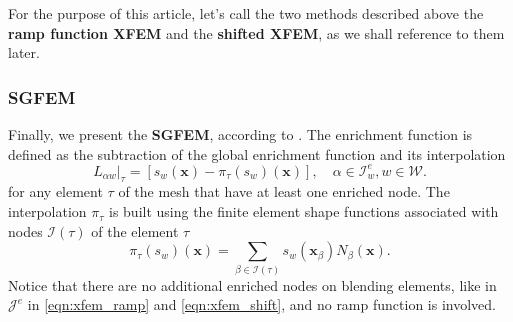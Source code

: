\documentclass{elsarticle}
\def\vc#1{\mathbf{\boldsymbol{#1}}}     %
\newcommand{\bx}{\vc{x}}
\begin{document}
For the purpose of this article, let's call the two methods described above the \textbf{ramp function XFEM}  
and the \textbf{shifted XFEM}, as we shall reference to them later.

\subsubsection{SGFEM}
Finally, we present the \textbf{SGFEM}, according to \cite{babuska_stable_2012,gupta_stable_2013}. 
The enrichment function is defined as the subtraction of the global enrichment function and its interpolation 
\begin{equation} \label{eqn:sgfem_enrich}
    L_{\alpha w}|_{\tau} = \left[s_w(\bx) - \pi_\tau (s_w)(\bx)\right],
    \quad \alpha\in\mathcal{I}^e_w, w\in\mathcal{W}.
\end{equation} 
for any element $\tau$ of the mesh that have at least one enriched node.
The interpolation $\pi_\tau$ is built using the finite element shape functions
associated with nodes $\mathcal{I}(\tau)$ of the element $\tau$
\begin{equation} \label{eqn:sgfem_interpolation}
    \pi_\tau (s_w)(\bx) = \sum_{\beta\in\mathcal{I}(\tau)} s_w(\bx_\beta) N_\beta(\bx).
\end{equation}
Notice that there are no additional enriched nodes on blending elements, like in $\mathcal{J}^e$ in 
\eqref{eqn:xfem_ramp} and \eqref{eqn:xfem_shift}, and no ramp function is involved.
\end{document}
